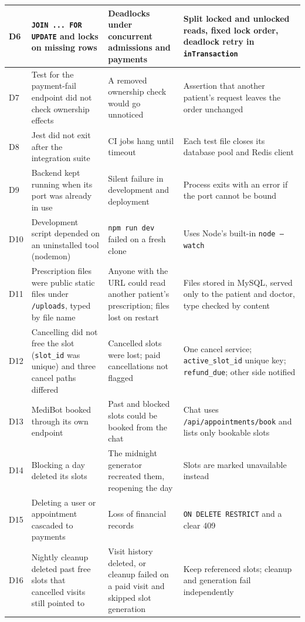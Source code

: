\begin{longtable}{|C{0.8cm}|L{4.3cm}|L{3.9cm}|L{4.2cm}|}
\hline
D6 & \texttt{JOIN ... FOR UPDATE} and locks on missing rows & Deadlocks under concurrent admissions and payments & Split locked and unlocked reads, fixed lock order, deadlock retry in \texttt{inTransaction} \\
\hline
D7 & Test for the payment-fail endpoint did not check ownership effects & A removed ownership check would go unnoticed & Assertion that another patient's request leaves the order unchanged \\
\hline
D8 & Jest did not exit after the integration suite & CI jobs hang until timeout & Each test file closes its database pool and Redis client \\
\hline
D9 & Backend kept running when its port was already in use & Silent failure in development and deployment & Process exits with an error if the port cannot be bound \\
\hline
D10 & Development script depended on an uninstalled tool (nodemon) & \texttt{npm run dev} failed on a fresh clone & Uses Node's built-in \texttt{node --watch} \\
\hline
D11 & Prescription files were public static files under \texttt{/uploads}, typed by file name & Anyone with the URL could read another patient's prescription; files lost on restart & Files stored in MySQL, served only to the patient and doctor, type checked by content \\
\hline
D12 & Cancelling did not free the slot (\texttt{slot\_id} was unique) and three cancel paths differed & Cancelled slots were lost; paid cancellations not flagged & One cancel service; \texttt{active\_slot\_id} unique key; \texttt{refund\_due}; other side notified \\
\hline
D13 & MediBot booked through its own endpoint & Past and blocked slots could be booked from the chat & Chat uses \texttt{/api/\allowbreak appointments/\allowbreak book} and lists only bookable slots \\
\hline
D14 & Blocking a day deleted its slots & The midnight generator recreated them, reopening the day & Slots are marked unavailable instead \\
\hline
D15 & Deleting a user or appointment cascaded to payments & Loss of financial records & \texttt{ON DELETE RESTRICT} and a clear 409 \\
\hline
D16 & Nightly cleanup deleted past free slots that cancelled visits still pointed to & Visit history deleted, or cleanup failed on a paid visit and skipped slot generation & Keep referenced slots; cleanup and generation fail independently \\

\end{longtable}
